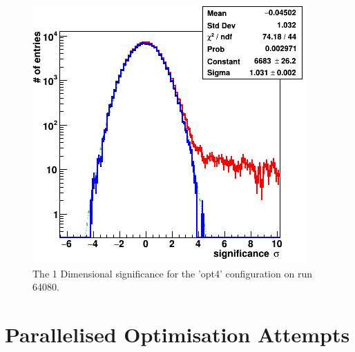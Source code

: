 \begin{figure}[ht] 
        \centering \includegraphics[width=0.5\columnwidth]{figures/opt4_sig.png}

        \caption{
                \label{fig:opt4_sig1D} The 1 Dimensional significance for the 'opt4' configuration on run 64080.
        }
\end{figure}

\section{Parallelised Optimisation Attempts}
